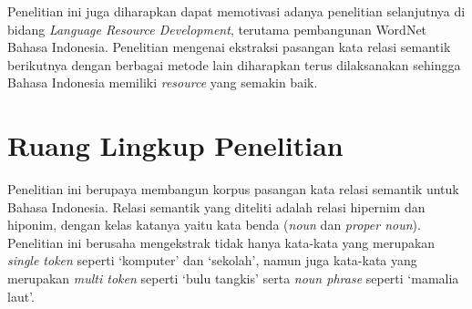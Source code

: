 Penelitian ini juga diharapkan dapat memotivasi adanya penelitian selanjutnya di bidang \textit{Language Resource Development}, terutama pembangunan WordNet Bahasa Indonesia. Penelitian mengenai ekstraksi pasangan kata relasi semantik berikutnya dengan berbagai metode lain diharapkan terus dilaksanakan sehingga Bahasa Indonesia memiliki \textit{resource} yang semakin baik.

%
\section{Ruang Lingkup Penelitian}
Penelitian ini berupaya membangun korpus pasangan kata relasi semantik untuk Bahasa Indonesia. Relasi semantik yang diteliti adalah relasi hipernim dan hiponim, dengan kelas katanya yaitu kata benda (\textit{noun} dan \textit{proper noun}). Penelitian ini berusaha mengekstrak tidak hanya kata-kata yang merupakan \textit{single token} seperti `komputer' dan `sekolah', namun juga kata-kata yang merupakan \textit{multi token} seperti `bulu tangkis' serta \textit{noun phrase} seperti `mamalia laut'.


%
